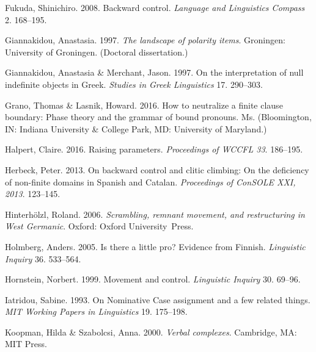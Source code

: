 \documentclass[output=paper]{langsci/langscibook}
\begin{document}
\begin{styleNurTexti}
Fukuda, Shinichiro. 2008. Backward control. \textit{Language and Linguistics Compass} 2. 168–195.
\end{styleNurTexti}

\begin{styleNurTexti}
Giannakidou, Anastasia. 1997. \textit{The landscape of polarity items}. Groningen: University of Groningen. (Doctoral dissertation.)
\end{styleNurTexti}

Giannakidou, Anastasia \& Merchant, Jason. 1997. On the interpretation of null indefinite objects in Greek. \textit{Studies in Greek Linguistics} 17. 290–303.

Grano, Thomas \& Lasnik, Howard. 2016. How to neutralize a finite clause boundary: Phase theory and the grammar of bound pronouns. Ms. (Bloomington, IN: Indiana University \& College Park, MD: University of Maryland.)

Halpert, Claire. 2016. Raising parameters. \textit{Proceedings of WCCFL 33}. 186–195.

\begin{stylepi}
Herbeck, Peter. 2013. On backward control and clitic climbing: On the deficiency of non-finite domains in Spanish and Catalan. \textit{Proceedings of ConSOLE XXI, 2013}. 123–145.
\end{stylepi}

Hinterhölzl, Roland. 2006. \textit{Scrambling, remnant movement, and restructuring in West Germanic}. Oxford: Oxford University~Press.~

\begin{styleNurTexti}
Holmberg, Anders. 2005. Is there a little pro? Evidence from Finnish. \textit{Linguistic Inquiry} 36. 533–564. 
\end{styleNurTexti}

\begin{styleNurTexti}
Hornstein, Norbert. 1999. Movement and control. \textit{Linguistic Inquiry} 30. 69–96.
\end{styleNurTexti}

\begin{styleNurTexti}
Iatridou, Sabine. 1993. On Nominative Case assignment and a few related things. \textit{MIT Working Papers in Linguistics} 19. 175–198.
\end{styleNurTexti}

Koopman, Hilda \& Szabolcsi, Anna. 2000. \textit{Verbal complexes}. Cambridge, MA: MIT Press.~
\end{document}
